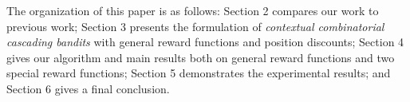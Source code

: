 \documentclass{article}
\newcommand{\wei}[1]{}
\newcommand{\wei}[1]{{\color{blue!50!black}  [\text{Wei:} #1]}}
\begin{document}




The organization of this paper is as follows: Section 2 compares our work to previous work; Section 3 presents the formulation of {\it contextual combinatorial cascading bandits} with general reward functions and position discounts; Section 4 gives our algorithm and main results both on general reward functions and two special reward functions; Section 5 demonstrates the experimental results; and Section 6 gives a final conclusion.

\end{document}
